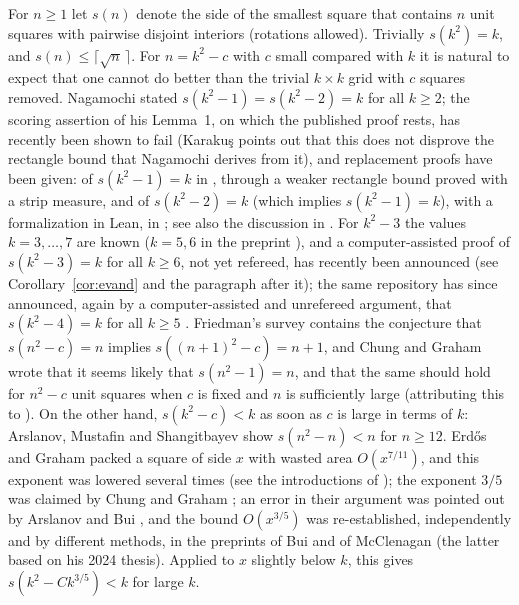 \documentclass[11pt]{amsart}
\theoremstyle{definition}
\theoremstyle{remark}
\begin{document}
For $n\ge 1$ let $s(n)$ denote the side of the smallest square that contains $n$ unit squares with pairwise
disjoint interiors (rotations allowed). Trivially $s(k^2)=k$, and $s(n)\le \lceil\sqrt n\,\rceil$.
For $n=k^2-c$ with $c$ small compared with $k$ it is natural to expect that one cannot do better than the trivial
$k\times k$ grid with $c$ squares removed. Nagamochi \cite{Nag} stated $s(k^2-1)=s(k^2-2)=k$ for all $k\ge2$;
the scoring assertion of his Lemma~1, on which the published proof rests, has recently been shown to fail
\cite{Che,Kar} (Karaku\c{s} points out that this does not disprove the rectangle bound that Nagamochi derives from
it), and replacement proofs have been given: of $s(k^2-1)=k$ in \cite{Kar}, through a weaker rectangle bound proved with
a strip measure, and of $s(k^2-2)=k$ (which implies $s(k^2-1)=k$), with a formalization in Lean, in \cite{Che}; see also
the discussion in \cite{Dan}. For $k^2-3$ the values $k=3,\dots,7$ are known
\cite{KS,Ben10,Ben16} ($k=5,6$ in the preprint \cite{Ben16}), and a computer-assisted proof of $s(k^2-3)=k$ for all $k\ge 6$, not yet refereed, has recently
been announced \cite{Dan} (see Corollary~\ref{cor:evand} and the paragraph after it); the same repository has since announced, again by a computer-assisted and unrefereed argument, that
$s(k^2-4)=k$ for all $k\ge5$ \cite[directory \texttt{s12/certificates/k2m4}]{Dan}. Friedman's survey \cite{Fri} contains the conjecture that $s(n^2-c)=n$ implies $s((n+1)^2-c)=n+1$, and Chung and
Graham \cite[concluding remarks]{CG09} wrote that it seems likely that $s(n^2-1)=n$, and that the same should hold for
$n^2-c$ unit squares when $c$ is fixed and $n$ is sufficiently large (attributing this to \cite{Fri}).
On the other hand, $s(k^2-c)<k$ as soon as $c$ is large in terms of $k$: Arslanov, Mustafin and Shangitbayev
\cite{AMS} show $s(n^2-n)<n$ for $n\ge 12$. Erd\H{o}s and Graham \cite{EG} packed a square of side $x$ with wasted
area $O(x^{7/11})$, and this exponent was lowered several times (see the introductions of \cite{McC,Bui}); the exponent $3/5$
was claimed by Chung and Graham \cite{CG}; an error in their argument was
pointed out by Arslanov and Bui \cite{AB}, and the bound $O(x^{3/5})$ was re-established, independently and by different methods,
in the preprints of Bui \cite{Bui} and of McClenagan \cite{McC} (the latter based on his 2024 thesis). Applied to $x$ slightly below $k$, this gives $s(k^2-Ck^{3/5})<k$ for large $k$.
\end{document}
